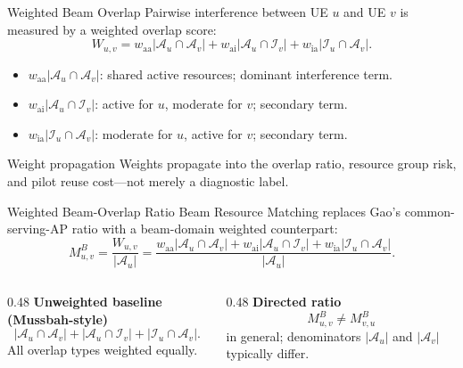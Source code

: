 \documentclass[10pt,aspectratio=169]{beamer}
\newcommand{\BRM}{Beam Resource Matching}
\newcommand{\waa}{w_{\mathrm{aa}}}
\newcommand{\wai}{w_{\mathrm{ai}}}
\newcommand{\wia}{w_{\mathrm{ia}}}
\newenvironment{tightitemize}{%
    \begin{itemize}
        \setlength{\itemsep}{2pt}
        \setlength{\parskip}{0pt}
        \setlength{\parsep}{0pt}
}{%
    \end{itemize}
}
\begin{document}
\begin{frame}{Weighted Beam Overlap}
    \small
    Pairwise interference between UE \(u\) and UE \(v\) is measured by a weighted overlap score:
    \[
        W_{u,v}
        =
        \waa|\mathcal{A}_u\cap\mathcal{A}_v|
        +
        \wai|\mathcal{A}_u\cap\mathcal{I}_v|
        +
        \wia|\mathcal{I}_u\cap\mathcal{A}_v|.
    \]

    \vspace{0.4em}
    \begin{tightitemize}
        \item \(\waa|\mathcal{A}_u\cap\mathcal{A}_v|\): shared active resources; dominant interference term.
        \item \(\wai|\mathcal{A}_u\cap\mathcal{I}_v|\): active for \(u\), moderate for \(v\); secondary term.
        \item \(\wia|\mathcal{I}_u\cap\mathcal{A}_v|\): moderate for \(u\), active for \(v\); secondary term.
    \end{tightitemize}

    \vspace{0.45em}
    \begin{block}{Weight propagation}
        Weights propagate into the overlap ratio, resource group risk, and pilot reuse cost---not merely a diagnostic label.
    \end{block}
\end{frame}

\begin{frame}{Weighted Beam-Overlap Ratio}
    \small
    \BRM{} replaces Gao's common-serving-AP ratio with a beam-domain weighted counterpart:
    \[
        M_{u,v}^{B}
        =
        \frac{W_{u,v}}{|\mathcal{A}_u|}
        =
        \frac{
            \waa|\mathcal{A}_u\cap\mathcal{A}_v|
            +
            \wai|\mathcal{A}_u\cap\mathcal{I}_v|
            +
            \wia|\mathcal{I}_u\cap\mathcal{A}_v|
        }{|\mathcal{A}_u|}.
    \]

    \vspace{0.5em}
    \begin{columns}[T,onlytextwidth]
        \begin{column}{0.48\textwidth}
            \textbf{Unweighted baseline (Mussbah-style)}
            \[
                |\mathcal{A}_u\cap\mathcal{A}_v|
                +
                |\mathcal{A}_u\cap\mathcal{I}_v|
                +
                |\mathcal{I}_u\cap\mathcal{A}_v|.
            \]
            All overlap types weighted equally.
        \end{column}
        \begin{column}{0.48\textwidth}
            \textbf{Directed ratio}
            \[
                M_{u,v}^{B}\neq M_{v,u}^{B}
            \]
            in general; denominators \(|\mathcal{A}_u|\) and \(|\mathcal{A}_v|\) typically differ.
        \end{column}
    \end{columns}
\end{frame}
\end{document}
